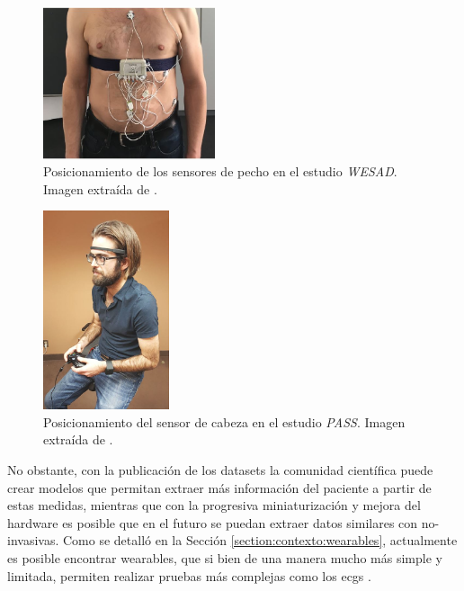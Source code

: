     \begin{figure}[h]
        \centering
        \includegraphics[width=0.45\textwidth]{figures/Posicionamiento pecho wesad.JPG}
        \caption[Posicionamiento de los sensores de pecho en el estudio \textit{WESAD}]
        {Posicionamiento de los sensores de pecho en el estudio \textit{WESAD}. Imagen extraída de \cite{schmidt_introducing_2018}.}
        \label{figure:estado_arte:pecho_wesad}
    \end{figure}

    \begin{figure}[h]
        \centering
        \includegraphics[width=0.33\textwidth]{figures/posiconamiento cabeza pass.JPG}
        \caption[Posicionamiento del sensor de cabeza en el estudio \textit{PASS}]
        {Posicionamiento del sensor de cabeza en el estudio \textit{PASS}. Imagen extraída de \cite{parent_pass_2020}.}
        \label{figure:estado_arte:cabeza_pass}
    \end{figure}

    No obstante, con la publicación de los \glspl{dataset} la comunidad científica puede crear modelos que permitan extraer más información del paciente a partir de estas medidas, mientras que con la progresiva miniaturización y mejora del hardware es posible que en el futuro se puedan extraer datos similares con \glspl{no-invasiva}. Como se detalló en la Sección \ref{section:contexto:wearables}, actualmente es posible encontrar \glspl{wearable}, que si bien de una manera mucho más simple y limitada, permiten realizar pruebas más complejas como los \glspl{ecg} \cite{garcia_electrocardiograma_2024}.

